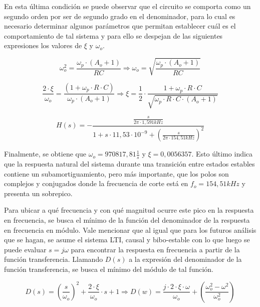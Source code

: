 En esta \'ultima condici\'on se puede observar que el circuito se comporta
como un segundo orden por ser de segundo grado en el denominador, 
para lo cual es necesario determinar algunos par\'ametros que permitan
establecer cu\'al es el comportamiento de tal sistema y para ello se 
despejan de las siguientes expresiones los valores de $\xi$ y $\omega_o$.

\begin{equation*}
	\omega_o^{2} = \frac{\omega_p \cdot (A_o + 1)}{RC} \Rightarrow \omega_o = \sqrt{\frac{\omega_p \cdot (A_o + 1)}{RC}}	
\end{equation*}

\begin{equation*}
	\frac{2 \cdot \xi}{\omega_o} = \frac{(1 + \omega_p \cdot R \cdot C)}{\omega_p \cdot(A_o + 1)}
	\Rightarrow \xi = \frac{1}{2} \cdot \frac{1 + \omega_p \cdot R \cdot C}{\sqrt{\omega_p \cdot R \cdot C \cdot (A_o + 1)}}
\end{equation*}

\begin{equation}
	H(s) = - \frac{\frac{s}{2 \pi \cdot 1,591kHz}}
	{1 + s \cdot 11,53 \cdot 10^{-9} + \left( \frac{s}{2 \pi \cdot 154,51kHz} \right)^{2}}
	\label{eq:derivador_transfer_polo_dominante}
\end{equation}

Finalmente, se obtiene que $\omega_o = 970817,81 \frac{1}{s}$ y $\xi = 0,0056357$. Esto \'ultimo indica que la respuesta natural del sistema durante una transici\'on entre estados estables contiene un subamortiguamiento, pero m\'as importante, que los polos son complejos y conjugados donde la frecuencia de corte est\'a en $f_o = 154,51kHz$ y presenta un sobrepico.

Para ubicar a qu\'e frecuencia y con qu\'e magnitud ocurre este pico en la respuesta en frecuencia, se busca el m\'inimo de la funci\'on del denominador de la respuesta en frecuencia en m\'odulo. Vale mencionar que al igual que para los futuros an\'alisis que se hagan, se asume el sistema LTI, causal y bibo-estable con lo que luego se puede evaluar $s = j \omega$ para encontrar la respuesta en frecuencia a partir de la funci\'on transferencia.
Llamando $D(s)$ a la expresi\'on del denominador de la funci\'on transferencia, se busca el m\'inimo del m\'odulo de tal funci\'on.

\begin{equation*}
	D(s) = \left( \frac{s}{\omega_o} \right)^{2} + \frac{2 \cdot \xi}{\omega_o} \cdot s + 1
	\Rightarrow
	D(w) = \frac{j \cdot 2 \cdot \xi \cdot \omega}{\omega_o} + \left( \frac{\omega_o^{2} - \omega^{2}}{\omega_o^{2}} \right)
\end{equation*}

